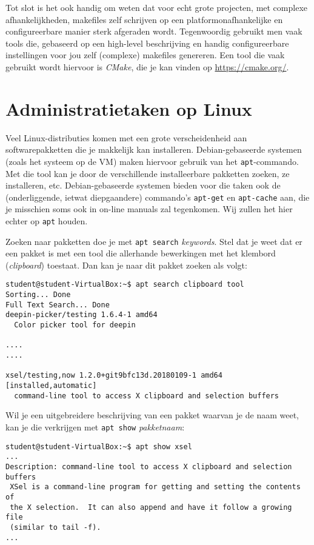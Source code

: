 \documentclass[a4paper,twoside,openany]{memoir}
\begin{document}
Tot slot is het ook handig om weten dat voor echt grote projecten, met complexe
afhankelijkheden, makefiles zelf schrijven op een platformonafhankelijke en
configureerbare manier sterk afgeraden wordt. Tegenwoordig gebruikt men vaak
tools die, gebaseerd op een high-level beschrijving en handig configureerbare
instellingen voor jou zelf (complexe) makefiles genereren. Een tool die vaak
gebruikt wordt hiervoor is \emph{CMake}, die je kan vinden op
\url{https://cmake.org/}.

\chapter{Administratietaken op Linux}

Veel Linux-distributies komen met een grote verscheidenheid aan
softwarepakketten die je makkelijk kan installeren. Debian-gebaseerde systemen
(zoals het systeem op de VM) maken hiervoor gebruik van het \verb!apt!-commando.
Met die tool kan je door de verschillende installeerbare pakketten zoeken, ze
installeren, etc. Debian-gebaseerde systemen bieden voor die taken ook de
(onderliggende, ietwat diepgaandere) commando's \verb!apt-get! en
\verb!apt-cache! aan, die je misschien soms ook in on-line manuals zal
tegenkomen. Wij zullen het hier echter op \verb!apt! houden.

Zoeken naar pakketten doe je met \verb!apt search! \emph{keywords}. Stel dat je
weet dat er een pakket is met een tool die allerhande bewerkingen met het
klembord (\emph{clipboard}) toestaat. Dan kan je naar dit pakket zoeken als
volgt:
\begin{verbatim}
student@student-VirtualBox:~$ apt search clipboard tool
Sorting... Done
Full Text Search... Done
deepin-picker/testing 1.6.4-1 amd64
  Color picker tool for deepin

....
....

xsel/testing,now 1.2.0+git9bfc13d.20180109-1 amd64 [installed,automatic]
  command-line tool to access X clipboard and selection buffers
\end{verbatim}

Wil je een uitgebreidere beschrijving van een pakket waarvan je de naam weet,
kan je die verkrijgen met \verb!apt show! \emph{pakketnaam}:

\begin{verbatim}
student@student-VirtualBox:~$ apt show xsel
...
Description: command-line tool to access X clipboard and selection buffers
 XSel is a command-line program for getting and setting the contents of
 the X selection.  It can also append and have it follow a growing file
 (similar to tail -f).
...
\end{verbatim}
\end{document}
